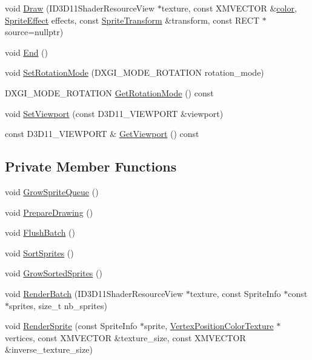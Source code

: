 \begin{DoxyCompactItemize}
\item 
void \hyperlink{classmage_1_1_sprite_batch_a9c10b2c38a57a46f82bff18d65ed47fa}{Draw} (I\+D3\+D11\+Shader\+Resource\+View $\ast$texture, const X\+M\+V\+E\+C\+T\+OR \&\hyperlink{namespacemage_a56eceea5a9bceb2b56073f3ea4945781}{color}, \hyperlink{namespacemage_a9cfe18123066ba4236f548f9de75d881}{Sprite\+Effect} effects, const \hyperlink{structmage_1_1_sprite_transform}{Sprite\+Transform} \&transform, const R\+E\+CT $\ast$source=nullptr)
\item 
void \hyperlink{classmage_1_1_sprite_batch_a9764372bb18b1c24a4a2f64ab0649569}{End} ()
\item 
void \hyperlink{classmage_1_1_sprite_batch_a61ab7462374d9190220629be7827ba4b}{Set\+Rotation\+Mode} (D\+X\+G\+I\+\_\+\+M\+O\+D\+E\+\_\+\+R\+O\+T\+A\+T\+I\+ON rotation\+\_\+mode)
\item 
D\+X\+G\+I\+\_\+\+M\+O\+D\+E\+\_\+\+R\+O\+T\+A\+T\+I\+ON \hyperlink{classmage_1_1_sprite_batch_ade698c44432d175ca55a4545b9adae85}{Get\+Rotation\+Mode} () const
\item 
void \hyperlink{classmage_1_1_sprite_batch_aab9eab10e3ea1c62b483a67a47d9ccdc}{Set\+Viewport} (const D3\+D11\+\_\+\+V\+I\+E\+W\+P\+O\+RT \&viewport)
\item 
const D3\+D11\+\_\+\+V\+I\+E\+W\+P\+O\+RT \& \hyperlink{classmage_1_1_sprite_batch_a67bdd7fb00644aefb3c7ecfaa7923a39}{Get\+Viewport} () const
\end{DoxyCompactItemize}
\subsection*{Private Member Functions}
\begin{DoxyCompactItemize}
\item 
void \hyperlink{classmage_1_1_sprite_batch_a7e12144793e4a69c2f9eb7aea9326049}{Grow\+Sprite\+Queue} ()
\item 
void \hyperlink{classmage_1_1_sprite_batch_a64542c95cf98e30dcdfdec0b24dbc2a9}{Prepare\+Drawing} ()
\item 
void \hyperlink{classmage_1_1_sprite_batch_a352714b5d02590245ab8ffe8489305f7}{Flush\+Batch} ()
\item 
void \hyperlink{classmage_1_1_sprite_batch_af7a5d406b02cd477c9b80eae9984aa86}{Sort\+Sprites} ()
\item 
void \hyperlink{classmage_1_1_sprite_batch_ae403aa1afdd7df1f67bfd98ced8e76a4}{Grow\+Sorted\+Sprites} ()
\item 
void \hyperlink{classmage_1_1_sprite_batch_a37356dc0119bcc4237ca9d05a40628e7}{Render\+Batch} (I\+D3\+D11\+Shader\+Resource\+View $\ast$texture, const Sprite\+Info $\ast$const $\ast$sprites, size\+\_\+t nb\+\_\+sprites)
\item 
void \hyperlink{classmage_1_1_sprite_batch_a97d810daa9bef4d5d5ec2210db6ad26f}{Render\+Sprite} (const Sprite\+Info $\ast$sprite, \hyperlink{structmage_1_1_vertex_position_color_texture}{Vertex\+Position\+Color\+Texture} $\ast$vertices, const X\+M\+V\+E\+C\+T\+OR \&texture\+\_\+size, const X\+M\+V\+E\+C\+T\+OR \&inverse\+\_\+texture\+\_\+size)
\end{DoxyCompactItemize}
